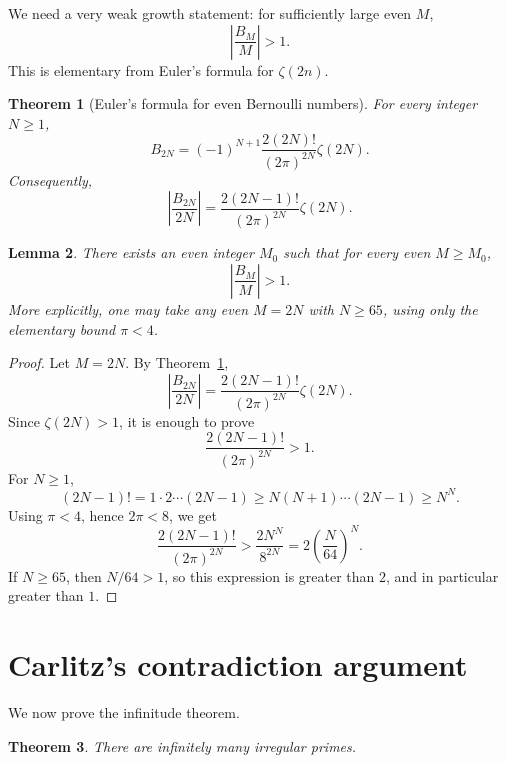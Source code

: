\documentclass[11pt]{article}
\newtheorem{theorem}{Theorem}[section]
\newtheorem{lemma}[theorem]{Lemma}
\begin{document}
We need a very weak growth statement: for sufficiently large even $M$,
\[
  \left|\frac{B_M}{M}\right|>1.
\]
This is elementary from Euler's formula for $\zeta(2n)$.

\begin{theorem}[Euler's formula for even Bernoulli numbers]\label{thm:euler_formula}
For every integer $N\ge 1$,
\[
  B_{2N}=(-1)^{N+1}\frac{2(2N)!}{(2\pi)^{2N}}\zeta(2N).
\]
Consequently,
\[
  \left|\frac{B_{2N}}{2N}\right|
  =\frac{2(2N-1)!}{(2\pi)^{2N}}\zeta(2N).
\]
\end{theorem}

\begin{lemma}\label{lem:Bernoulli_growth}
There exists an even integer $M_0$ such that for every even $M\ge M_0$,
\[
  \left|\frac{B_M}{M}\right|>1.
\]
More explicitly, one may take any even $M=2N$ with $N\ge 65$, using only the elementary bound $\pi<4$.
\end{lemma}

\begin{proof}
Let $M=2N$.  By Theorem~\ref{thm:euler_formula},
\[
  \left|\frac{B_{2N}}{2N}\right|
  =\frac{2(2N-1)!}{(2\pi)^{2N}}\zeta(2N).
\]
Since $\zeta(2N)>1$, it is enough to prove
\[
  \frac{2(2N-1)!}{(2\pi)^{2N}}>1.
\]
For $N\ge 1$,
\[
  (2N-1)! =1\cdot 2\cdots (2N-1)\ge N(N+1)\cdots(2N-1)\ge N^N.
\]
Using $\pi<4$, hence $2\pi<8$, we get
\[
  \frac{2(2N-1)!}{(2\pi)^{2N}}
  > \frac{2N^N}{8^{2N} }
  = 2\left(\frac{N}{64}\right)^N.
\]
If $N\ge 65$, then $N/64>1$, so this expression is greater than $2$, and in particular greater than $1$.
\end{proof}

\section{Carlitz's contradiction argument}

We now prove the infinitude theorem.

\begin{theorem}\label{thm:infinite_irregular}
There are infinitely many irregular primes.
\end{theorem}
\end{document}
